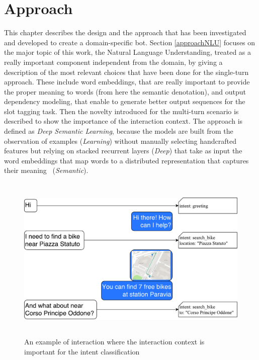 
\chapter{Approach}
\label{approach}

This chapter describes the design and the approach that has been investigated and developed to create a domain-specific bot. Section \ref{approachNLU} focuses on the major topic of this work, the Natural Language Understanding, treated as a really important component independent from the domain, by giving a description of the most relevant choices that have been done for the single-turn approach. These include word embeddings, that are really important to provide the proper meaning to words (from here the semantic denotation), and output dependency modeling, that enable to generate better output sequences for the slot tagging task. Then the novelty introduced for the multi-turn scenario is described to show the importance of the interaction context. The approach is defined as \textit{Deep Semantic Learning}, because the models are built from the observation of examples (\textit{Learning}) without manually selecting handcrafted features but relying on stacked recurrent layers (\textit{Deep}) that take as input the word embeddings that map words to a distributed representation that captures their meaning~\cite{sahlgren2008distributional} (\textit{Semantic}).

\begin{figure}[!htb]
    \centering
    \includegraphics[max width=0.8\linewidth,max height=8cm,keepaspectratio]{figures/multiTurnImportance}
    \caption{An example of interaction where the interaction context is important for the intent classification}\label{fig:multiTurnImportance}
\end{figure}

